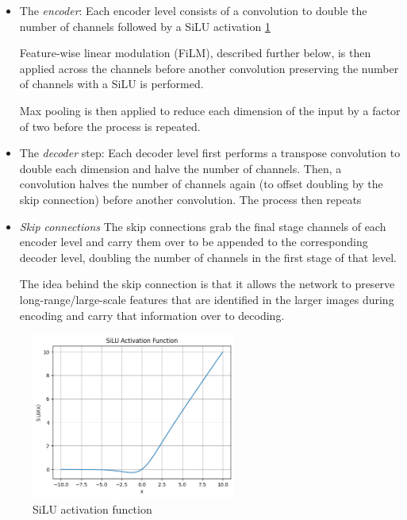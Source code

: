 \documentclass[12pt]{article}
\begin{document}
\begin{itemize}
	\item The \textit{encoder}: Each encoder level consists of a convolution to double the number of channels followed
	by a SiLU activation \ref{fig:silu}
	
	Feature-wise linear modulation (FiLM), described further below, is then applied
	across the channels before another convolution preserving the number of channels with a SiLU is performed.
	
	Max pooling is then applied to reduce each dimension of the input by a factor of two before the process is repeated.

	\item The \textit{decoder} step: Each decoder level first performs a transpose convolution to double each dimension and halve 
	the number of channels.
	Then, a convolution halves the number of channels again (to offset doubling by the skip connection) before another convolution. The process then repeats

	\item \textit{Skip connections} The skip connections grab the final stage channels of each encoder level and carry them over
	to be appended to the corresponding decoder level, doubling the number of channels in the first stage of that level.

	The idea behind the skip connection is that it allows the network to preserve long-range/large-scale features that are identified
	in the larger images during encoding and carry that information over to decoding. 
\end{itemize}

\begin{figure}
	\begin{center}
	\includegraphics[width=0.6\textwidth]{figures/SiLU.png}
	\end{center}
	\caption{SiLU activation function}
	\label{fig:silu}
\end{figure}
\end{document}
